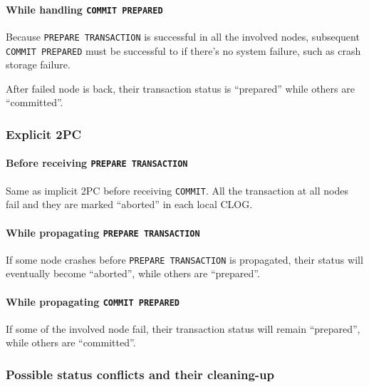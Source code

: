   \paragraph*{While handling \texttt{COMMIT PREPARED}}
  
    Because {\tt PREPARE TRANSACTION} is successful in all the involved nodes, subsequent
    {\tt COMMIT PREPARED} must be successful to if there's no system failure, such as crash
    storage failure.
    
    After failed node is back, their transaction status is ``prepared'' while others are ``committed''.



\subsubsection{Explicit 2PC}

  \paragraph*{Before receiving \texttt{PREPARE TRANSACTION}}
  
    Same as implicit 2PC before receiving \texttt{COMMIT}.
    All the transaction at all nodes fail and they are marked ``aborted'' in each local CLOG.
  
  \paragraph*{While propagating \texttt{PREPARE TRANSACTION}}
  
    If some node crashes before \texttt{PREPARE TRANSACTION} is propagated, their status will
	eventually become ``aborted'', while others are ``prepared''.
  
  \paragraph*{While propagating \texttt{COMMIT PREPARED}}
  
    If some of the involved node fail, their transaction status will remain ``prepared'',
	while others are ``committed''.



\subsubsection{Possible status conflicts and their cleaning-up}

